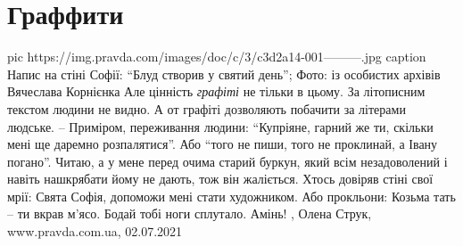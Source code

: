  
 
 
 
 
\chapter{Граффити}

\ifcmt
  pic https://img.pravda.com/images/doc/c/3/c3d2a14-001---------.jpg
	caption Напис на стіні Софії: \enquote{Блуд створив у святий день}; Фото: із особистих архівів Вячеслава Корнієнка
\fi
Але цінність \emph{графіті} не тільки в цьому. За літописним текстом людини не
видно.  А от графіті дозволяють побачити за літерами людське.  – Приміром,
переживання людини: \enquote{Купріяне, гарний же ти, скільки мені ще даремно
розпалятися}. Або \enquote{того не пиши, того не проклинай, а Івану погано}.
Читаю, а у мене перед очима старий буркун, який всім незадоволений і навіть
нашкрябати йому не дають, тож він жаліється.  Хтось довіряв стіні свої мрії:
Свята Софія, допоможи мені стати художником.  Або прокльони: Козьма тать – ти
вкрав м'ясо. Бодай тобі ноги сплутало. Амінь!
, 
Олена Струк, www.pravda.com.ua, 02.07.2021 

